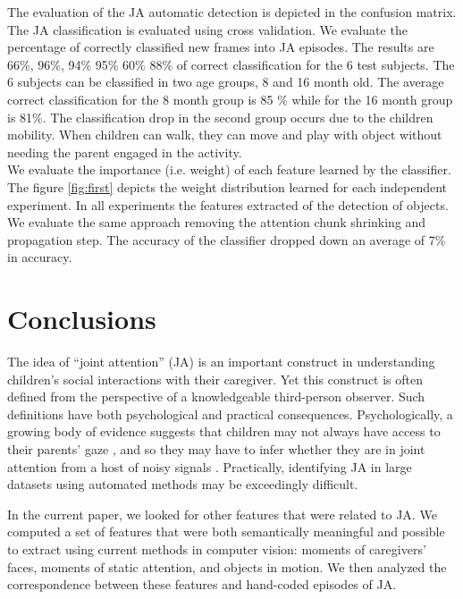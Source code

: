 \documentclass[10pt,letterpaper]{article}
\begin{document}
The evaluation of the JA automatic detection is depicted in the confusion matrix.
The JA classification is evaluated using cross validation. We evaluate the percentage  of correctly classified new frames into JA episodes. The results are 66\%, 96\%, 94\% 95\% 60\% 88\% of correct classification for the 6 test subjects. The 6 subjects can be classified in two age groups, 8 and 16 month old. The average correct classification for the 8 month group is 85 \% while for the 16 month group is 81\%. The classification drop in the second group occurs due to the children mobility. When children can walk, they can move and play with object without needing the parent engaged in the activity.\\

We evaluate the importance (i.e. weight) of each feature learned by the classifier. The figure \ref{fig:first} depicts the weight distribution learned for each independent experiment. In all experiments the features extracted of the detection of objects.\\

We evaluate the same approach removing the attention chunk shrinking and propagation step. The accuracy of the classifier dropped down an average of 7\% in accuracy. 


\section{Conclusions}

The idea of ``joint attention'' (JA) is an important construct in understanding children's social interactions with their caregiver. Yet this construct is often defined from the perspective of a knowledgeable third-person observer. Such definitions have both psychological and practical consequences. Psychologically, a growing body of evidence suggests that children may not always have access to their parents' gaze \cite{franchak2011,yu2013,frank2013}, and so they may have to infer whether they are in joint attention from a host of noisy signals \cite{frank2013b}. Practically, identifying JA in large datasets using automated methods may be exceedingly difficult. 

In the current paper, we looked for other features that were related to JA. We computed a set of features that were both semantically meaningful and possible to extract using current methods in computer vision: moments of caregivers' faces, moments of static attention, and objects in motion. We then analyzed the correspondence between these features and hand-coded episodes of JA. 
\end{document}
